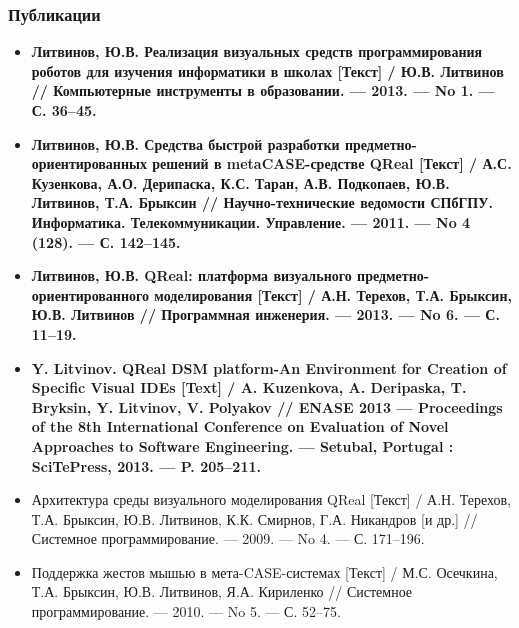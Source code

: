 \documentclass[14pt]{beamer}
\begin{document}
\begin{frame}
    \frametitle{Публикации}
    \begin{itemize}
        \scriptsize
        \item \textbf{Литвинов, Ю.В. Реализация визуальных средств программирования роботов
            для изучения информатики в школах [Текст] / Ю.В. Литвинов // Компьютерные
            инструменты в образовании. --- 2013. --- No 1. --- С. 36--45.}
        \item \textbf{Литвинов, Ю.В. Средства быстрой разработки предметно-ориентированных
            решений в metaCASE-средстве QReal [Текст] / А.С. Кузенкова, А.О. Дерипаска, 
            К.С. Таран, А.В. Подкопаев, Ю.В. Литвинов, Т.А. Брыксин 
            // Научно-технические ведомости СПбГПУ. Информатика. Телекоммуникации.
            Управление. --- 2011. --- No 4 (128). --- С. 142--145.}
        \item \textbf{Литвинов, Ю.В. QReal: платформа визуального предметно-ориентированного
            моделирования [Текст] / А.Н. Терехов, Т.А. Брыксин, Ю.В. Литвинов 
            // Программная инженерия. --- 2013. --- No 6. --- С. 11--19.}
        \item \textbf{Y. Litvinov. QReal DSM platform-An Environment for Creation of
            Specific Visual IDEs [Text] / A. Kuzenkova, A. Deripaska, T. Bryksin, 
            Y. Litvinov, V. Polyakov 
            // ENASE 2013 --- Proceedings of the 8th International Conference on 
            Evaluation of Novel Approaches to Software Engineering. --- Setubal, Portugal : 
            SciTePress, 2013. --- P. 205--211.}
        \item Архитектура среды визуального моделирования QReal [Текст] / А.Н. Терехов,
            Т.А. Брыксин, Ю.В. Литвинов, К.К. Смирнов, Г.А. Никандров [и др.] 
            // Системное программирование. --- 2009. --- No 4. --- С. 171--196.
        \item Поддержка жестов мышью в мета-CASE-системах [Текст] 
            / М.С. Осечкина, Т.А. Брыксин, Ю.В. Литвинов, Я.А. Кириленко 
            // Системное программирование. --- 2010. --- No 5. --- С. 52--75.
    \end{itemize}
\end{frame}
\end{document}

